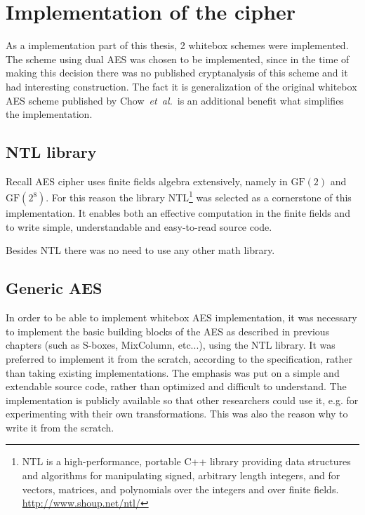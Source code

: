 \documentclass[11pt,oneside,final]{fithesis2}
\newcommand{\gfe}{\ensuremath{\text{GF}\left(2^8\right)}}
\newcommand{\gf}{\ensuremath{\text{GF}\left(2\right)}}
\newcommand{\eal}{\emph{et~al.}}
\begin{document}
    \section{Implementation of the cipher}
    As a implementation part of this thesis, 2 whitebox schemes were implemented.
    The scheme using dual AES was chosen to be implemented, since in the time of making this decision there was no published cryptanalysis
    of this scheme and it had interesting construction. The fact it is generalization of the original whitebox AES scheme
    published by Chow~\eal\ is an additional benefit what simplifies the implementation.
    
    \subsection{NTL library}
    Recall AES cipher uses finite fields algebra extensively, namely in $\gf$ and $\gfe$. For this reason the library
    NTL\footnote{NTL is a high-performance, portable C++ library providing data structures and algorithms for manipulating signed, arbitrary length integers, 
	and for vectors, matrices, and polynomials over the integers and over finite fields. \url{http://www.shoup.net/ntl/}} was selected
    as a cornerstone of this implementation. It enables both an effective computation in the finite fields and to write simple, understandable and easy-to-read
    source code. 
    
    Besides NTL there was no need to use any other math library.
    
    \subsection{Generic AES}
    In order to be able to implement whitebox AES implementation, it was necessary to implement the basic building blocks of the AES as described in
    previous chapters (such as S-boxes, MixColumn, etc...), using the NTL library. It was preferred to implement it from the scratch, according to the specification,
    rather than taking existing implementations. The emphasis was put on a simple and extendable source code, rather than optimized and difficult to understand.
    The implementation is publicly available so that other researchers could use it, e.g. for experimenting with their own transformations. This was also 
    the reason why to write it from the scratch.
 
\end{document}
